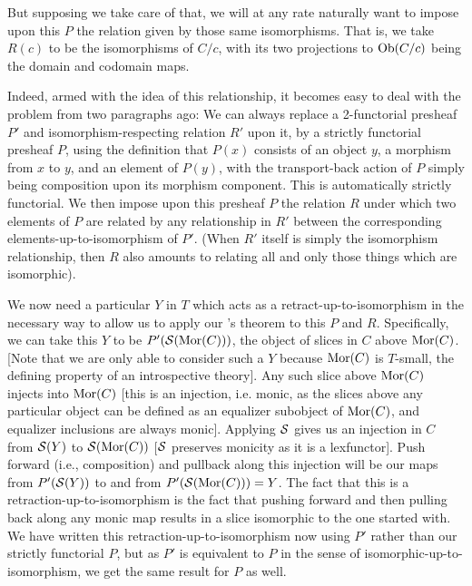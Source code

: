But supposing we take care of that, we will at any rate naturally want to impose upon this $P$ the relation given by those same isomorphisms. That is, we take $R(c)$ to be the isomorphisms of $C/c$, with its two projections to $\operatorname{Ob}(C/c)$ being the domain and codomain maps.

Indeed, armed with the idea of this relationship, it becomes easy to deal with the problem from two paragraphs ago: We can always replace a 2-functorial presheaf $P'$ and isomorphism-respecting relation $R'$ upon it, by a strictly functorial presheaf $P$, using the definition that $P(x)$ consists of an object $y$, a morphism from $x$ to $y$, and an element of $P(y)$, with the transport-back action of $P$ simply being composition upon its morphism component. This is automatically strictly functorial. We then impose upon this presheaf $P$ the relation $R$ under which two elements of $P$ are related by any relationship in $R'$ between the corresponding elements-up-to-isomorphism of $P'$. (When $R'$ itself is simply the isomorphism relationship, then $R$ also amounts to relating all and only those things which are isomorphic). 

We now need a particular $Y$ in $T$ which acts as a retract-up-to-isomorphism in the necessary way to allow us to apply our \Loeb's theorem to this $P$ and $R$. Specifically, we can take this $Y$ to be $P'(\mathcal{S}(\operatorname{Mor}(C)))$, the object of slices in $C$ above $\operatorname{Mor}(C)$. [Note that we are only able to consider such a $Y$ because $\operatorname{Mor}(C)$ is $T$-small, the defining property of an introspective theory]. Any such slice above $\operatorname{Mor}(C)$ injects into $\operatorname{Mor}(C)$ [this is an injection, i.e. monic, as the slices above any particular object can be defined as an equalizer subobject of $\operatorname{Mor}(C)$, and equalizer inclusions are always monic]. Applying $\mathcal{S}$ gives us an injection in $C$ from $\mathcal{S}(Y)$ to $\mathcal{S}(\operatorname{Mor}(C))$ [$\mathcal{S}$ preserves monicity as it is a lexfunctor]. Push forward (i.e., composition) and pullback along this injection will be our maps from $P'(\mathcal{S}(Y))$ to and from $P'(\mathcal{S}(\operatorname{Mor}(C))) = Y$. The fact that this is a retraction-up-to-isomorphism is the fact that pushing forward and then pulling back along any monic map results in a slice isomorphic to the one started with. We have written this retraction-up-to-isomorphism now using $P'$ rather than our strictly functorial $P$, but as $P'$ is equivalent to $P$ in the sense of isomorphic-up-to-isomorphism, we get the same result for $P$ as well. 

